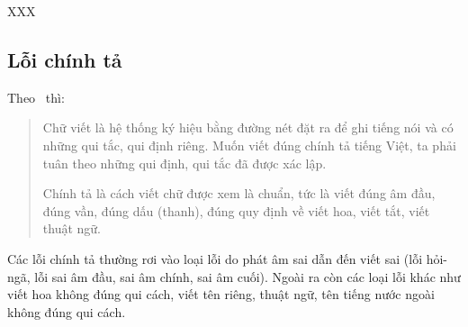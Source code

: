 \documentclass[a4paper,oneside,14pt]{extbook} %
\begin{document}
XXX%


\subsection{Lỗi chính tả}


Theo~\cite{LoiChinhTa} thì:
\begin{verse}
  Chữ viết là hệ thống ký hiệu bằng đường nét đặt ra để ghi tiếng nói
  và có những qui tắc, qui định riêng. Muốn viết đúng chính tả tiếng
  Việt, ta phải tuân theo những qui định, qui tắc đã được xác lập.

  Chính tả là cách viết chữ được xem là chuẩn, tức là viết đúng âm
  đầu, đúng vần, đúng dấu (thanh), đúng quy định về viết hoa, viết
  tắt, viết thuật ngữ.
\end{verse}

Các lỗi chính tả thường rơi vào loại lỗi do phát âm sai dẫn đến viết
sai (lỗi hỏi-ngã, lỗi sai âm đầu, sai âm chính, sai âm cuối). Ngoài ra
còn các loại lỗi khác như viết hoa không đúng qui cách, viết tên
riêng, thuật ngữ, tên tiếng nước ngoài không đúng qui cách.





\end{document}

